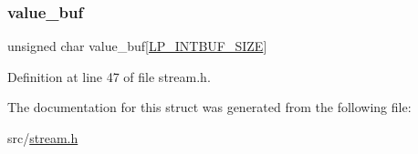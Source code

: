 \subsubsection{\texorpdfstring{value\+\_\+buf}{value\_buf}}
{\footnotesize\ttfamily unsigned char value\+\_\+buf\mbox{[}\hyperlink{listpack_8h_ab31e5c173b595ae4e703b72eb435a6e9}{L\+P\+\_\+\+I\+N\+T\+B\+U\+F\+\_\+\+S\+I\+ZE}\mbox{]}}



Definition at line 47 of file stream.\+h.



The documentation for this struct was generated from the following file\+:\begin{DoxyCompactItemize}
\item 
src/\hyperlink{stream_8h}{stream.\+h}\end{DoxyCompactItemize}

